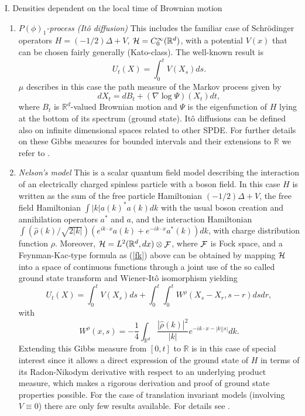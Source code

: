 \documentclass[a4paper,11pt]{article}
\newcommand{\R}{\mathbb{R}}
\newcommand{\F}{\mathop{\mathrm{{\cal F}}}\nolimits}
\begin{document}
\medskip
\vspace{0.1cm}
\noindent
I. Densities dependent on the local time of Brownian motion
\begin{enumerate}
\item[(1)]
{\it $P(\phi)_1$-process (It\^o diffusion)} \quad 
This includes the familiar case of Schr\"odinger operators $H = 
(-1/2)\Delta + V$, ${\cal H} = C_0^\infty(\R^d)$, with a potential 
$V(x)$ that can be chosen fairly generally (Kato-class). The 
well-known result is 
$$
U_t(X) = \int_0^t V(X_s) ds.
$$
$\mu$ describes in this case the path measure of the Markov process 
given by 
$$
dX_t = dB_t + (\nabla\log\Psi)(X_t)dt,
$$
where $B_t$ is $\R^d$-valued Brownian motion and $\Psi$ is the
eigenfunction of $H$ lying at the bottom of its spectrum (ground
state). It\^o diffusions can be defined also on infinite dimensional 
spaces related to other SPDE. For further details on these Gibbs 
measures for bounded intervals and their extensions to $\R$ we refer 
to \cite{Sim75,Sim82,BL}.


\item[(2)] 
{\it Nelson's model} \quad 
This is a scalar quantum field model describing the interaction 
of an electrically charged spinless particle with a boson field. In
this case $H$ is written as the sum of the free particle Hamiltonian
$(-1/2)\Delta + V$, the free field Hamiltonian $\int |k|a(k)^*a(k)dk$
with the usual boson creation and annihilation operators $a^*$ and $a$,
and the interaction Hamiltonian $\int(\widehat\rho(k)/{\sqrt{2|k|}})
(e^{ik\cdot x}a(k) + e^{-ik\cdot x}a^*(k))dk$, with charge
distribution function $\rho$. Moreover, ${\cal H} = L^2(\R^d,dx)
\otimes \F$, where $\F$ is Fock space, and a Feynman-Kac-type formula 
as (\ref{fk}) above can be obtained by mapping $\cal H$ into a space 
of continuous functions through a joint use of the so called ground 
state transform and Wiener-It\^o isomorphism yielding
$$
U_t(X) = \int_0^t V(X_s) ds + \int_0^t \int_0^t W^\rho(X_s-X_r,s-r) 
dsdr,
$$
with 
$$
W^\rho(x,s) = -\frac{1}{4}\int_{\R^d} \frac{|\widehat \rho(k)|^2}{|k|} 
e^{-i k\cdot x - |k||s|} dk.
$$
Extending this Gibbs measure from $[0,t]$ to $\R$ 
is in this case of special interest since it allows a direct 
expression of the ground state of $H$ in terms of its Radon-Nikodym 
derivative with respect to an underlying product measure, which makes 
a rigorous derivation and proof of ground state properties possible. 
For the case of translation invariant models (involving $V \equiv 0$) 
there are only few results available. For details see 
\cite{LM,LMS1,LMS2,BHLMS}. 


\end{enumerate}
\end{document}
